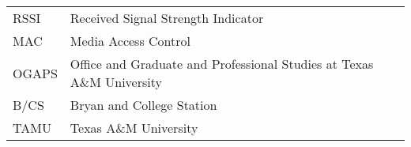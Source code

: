 \TAMUNomenclatureFormat

	\begin{table}[htbp]
	    \begin{tabular}{@{}p{} p{}@{}}
		RSSI  &  Received Signal Strength Indicator\\[2ex]
		MAC   &  Media Access Control\\[2ex]
		OGAPS	&	Office and Graduate and Professional Studies at Texas A\&M University\\	[2ex]
		B/CS		&	Bryan and College Station\\	[2ex] %
		TAMU			&	Texas A\&M University\\	[2ex]
	    \end{tabular}%
	\end{table}



